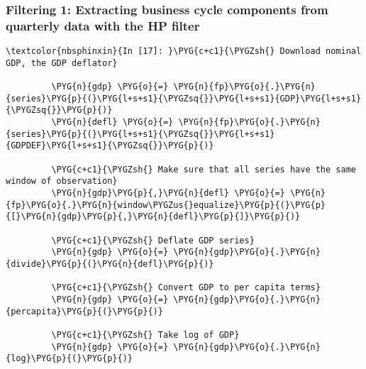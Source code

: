 \documentclass[letterpaper,10pt,openany,oneside,english]{sphinxmanual}
\begin{document}
\subsubsection{Filtering 1: Extracting business cycle components from quarterly data with the HP filter}
\label{\detokenize{fredpy_examples:Filtering-1:-Extracting-business-cycle-components-from-quarterly-data-with-the-HP-filter}}
%
\begin{Verbatim}[commandchars=\\\{\}]
\textcolor{nbsphinxin}{In [17]: }\PYG{c+c1}{\PYGZsh{} Download nominal GDP, the GDP deflator}
         
         \PYG{n}{gdp} \PYG{o}{=} \PYG{n}{fp}\PYG{o}{.}\PYG{n}{series}\PYG{p}{(}\PYG{l+s+s1}{\PYGZsq{}}\PYG{l+s+s1}{GDP}\PYG{l+s+s1}{\PYGZsq{}}\PYG{p}{)}
         \PYG{n}{defl} \PYG{o}{=} \PYG{n}{fp}\PYG{o}{.}\PYG{n}{series}\PYG{p}{(}\PYG{l+s+s1}{\PYGZsq{}}\PYG{l+s+s1}{GDPDEF}\PYG{l+s+s1}{\PYGZsq{}}\PYG{p}{)}
         
         \PYG{c+c1}{\PYGZsh{} Make sure that all series have the same window of observation}
         \PYG{n}{gdp}\PYG{p}{,}\PYG{n}{defl} \PYG{o}{=} \PYG{n}{fp}\PYG{o}{.}\PYG{n}{window\PYGZus{}equalize}\PYG{p}{(}\PYG{p}{[}\PYG{n}{gdp}\PYG{p}{,}\PYG{n}{defl}\PYG{p}{]}\PYG{p}{)}
         
         \PYG{c+c1}{\PYGZsh{} Deflate GDP series}
         \PYG{n}{gdp} \PYG{o}{=} \PYG{n}{gdp}\PYG{o}{.}\PYG{n}{divide}\PYG{p}{(}\PYG{n}{defl}\PYG{p}{)}
         
         \PYG{c+c1}{\PYGZsh{} Convert GDP to per capita terms}
         \PYG{n}{gdp} \PYG{o}{=} \PYG{n}{gdp}\PYG{o}{.}\PYG{n}{percapita}\PYG{p}{(}\PYG{p}{)}
         
         \PYG{c+c1}{\PYGZsh{} Take log of GDP}
         \PYG{n}{gdp} \PYG{o}{=} \PYG{n}{gdp}\PYG{o}{.}\PYG{n}{log}\PYG{p}{(}\PYG{p}{)}
\end{Verbatim}
\end{document}
